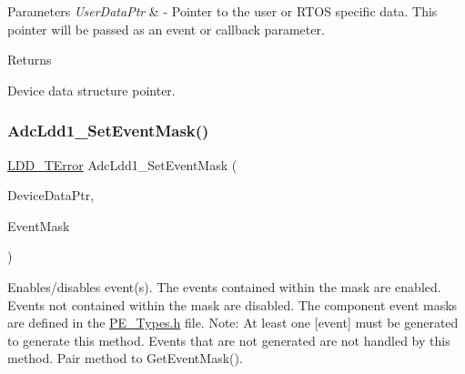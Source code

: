 \begin{DoxyParams}{Parameters}
{\em User\+Data\+Ptr} & -\/ Pointer to the user or R\+T\+OS specific data. This pointer will be passed as an event or callback parameter. \\
\hline
\end{DoxyParams}
\begin{DoxyReturn}{Returns}

\begin{DoxyItemize}
\item Device data structure pointer. 
\end{DoxyItemize}
\end{DoxyReturn}
\mbox{\label{group___adc_ldd1__module_ga12092218fe1fa9a31e8381eded85be0c}} 
\subsubsection{\texorpdfstring{Adc\+Ldd1\+\_\+\+Set\+Event\+Mask()}{AdcLdd1\_SetEventMask()}}
{\footnotesize\ttfamily \hyperlink{group___p_e___types__module_ga24c2b045fd04e79e85f261ce4df35588}{L\+D\+D\+\_\+\+T\+Error} Adc\+Ldd1\+\_\+\+Set\+Event\+Mask (\begin{DoxyParamCaption}\item[{\hyperlink{group___p_e___types__module_gac5cf1362f1f0e3a2ce71b1bf2276d091}{L\+D\+D\+\_\+\+T\+Device\+Data} $\ast$}]{Device\+Data\+Ptr,  }\item[{\hyperlink{group___p_e___types__module_gafbe7f4d4e51560399c3bdd0218584533}{L\+D\+D\+\_\+\+T\+Event\+Mask}}]{Event\+Mask }\end{DoxyParamCaption})}



Enables/disables event(s). The events contained within the mask are enabled. Events not contained within the mask are disabled. The component event masks are defined in the \hyperlink{_p_e___types_8h}{P\+E\+\_\+\+Types.\+h} file. Note\+: At least one \mbox{[}event\mbox{]} must be generated to generate this method. Events that are not generated are not handled by this method. Pair method to Get\+Event\+Mask(). 



